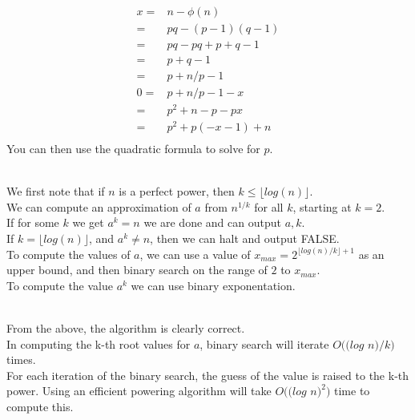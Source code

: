 \documentclass{assignment}
\begin{document}
\begin{problemlist}
\pbitem
\begin{problem}
\end{problem}
\begin{answer}
  \\
  \begin{align*}
    x=&n-\phi(n)\\
    =&pq-(p-1)(q-1)\\
    =&pq-pq+p+q-1\\
    =&p+q-1\\
    =&p+n/p-1\\
    0=&p+n/p-1-x\\
    =&p^2+n-p-px\\
    =&p^2+p(-x-1)+n\\
  \end{align*}
  You can then use the quadratic formula to solve for $p$.
\end{answer}
\clearpage
\pbitem
\begin{problem}
\end{problem}
\begin{answer}
  \\
  We first note that if $n$ is a perfect power, then $k \le \lfloor log(n)\rfloor$.\\
  We can compute an approximation of $a$ from $n^{1/k}$ for all $k$, starting at $k=2$.\\
  If for some $k$ we get $a^k=n$ we are done and can output $a,k$.\\
  If $k=\lfloor log(n)\rfloor$, and $a^k\neq n$, then we can halt and output FALSE.\\
  To compute the values of $a$, we can use a value of $x_{max}=2^{\lfloor log(n)/k\rfloor +1}$ as an upper bound, and then binary search on the range of $2$ to $x_{max}$.\\
  To compute the value $a^k$ we can use binary exponentation.\\
  \begin{algorithm}
    \;
  \end{algorithm}
  \\
  From the above, the algorithm is clearly correct.\\
  In computing the k-th root values for $a$, binary search will iterate $O((log$ $n)/k)$ times.\\
  For each iteration of the binary search, the guess of the value is raised to the k-th power. Using an efficient powering algorithm will take $O((log$ $n)^2)$ time to compute this.\\

\end{answer}
\end{problemlist}
\end{document}
